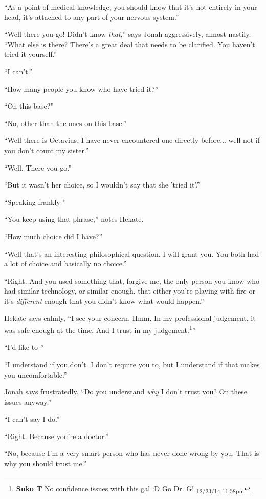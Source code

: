 ``As a point of medical knowledge, you should know that it's not entirely in your head, it's attached to any part of your nervous system.''

``Well there you go!  Didn't know \textit{that},'' says Jonah aggressively, almost nastily.  ``What else is there?  There's a great deal that needs to be clarified.  You haven't tried it yourself.''

``I can't.''

``How many people you know who have tried it?''

``On this base?''

``No, other than the ones on this base.''

``Well there is Octavius, I have never encountered one directly before... well not if you don't count my sister.''

``Well.  There you go.''

``But it wasn't her choice, so I wouldn't say that she 'tried it'.''

``Speaking frankly-''

``You keep using that phrase,'' notes Hekate.

``How much choice did I have?''

``Well that's an interesting philosophical question. I will grant you.  You both had a lot of choice and basically no choice.''

``Right.  And you used something that, forgive me, the only person you know who had similar technology, or similar enough, that either you're playing with fire or it's \textit{different} enough that you didn't know what would happen.''

Hekate says calmly, ``I see your concern.  Hmm.  In my professional judgement, it was safe enough at the time.  And I trust in my judgement.\footnote{\textbf{Suko T }No confidence issues with this gal :D  Go Dr. G! \textsubscript{12/23/14 11:58pm}}''

``I'd like to-''

``I understand if you don't.  I don't require you to, but I understand if that makes you uncomfortable.''

Jonah says frustratedly, ``Do you understand \textit{why} I don't trust you?  On these issues anyway.''

``I can't say I do.''

``Right.  Because you're a doctor.''

``No, because I'm a very smart person who has never done wrong by you. That is why you should trust me.''

